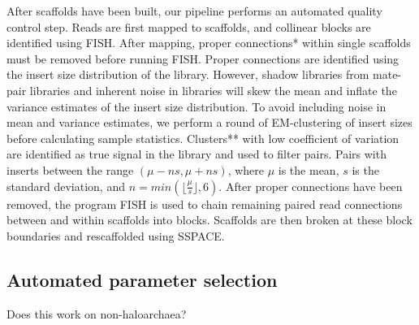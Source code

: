 \documentclass{bioinfo}
\begin{document}
After scaffolds have been built, our pipeline performs an automated quality control step.
Reads are first mapped to scaffolds, and collinear blocks are identified using FISH. After mapping,
proper connections* within single scaffolds must be removed before running FISH. Proper connections
are identified using the insert size distribution of the library. However, shadow libraries from 
mate-pair libraries and inherent noise in libraries will skew the mean and inflate the variance 
estimates of the insert size distribution. To avoid including noise in mean and variance estimates, 
we perform a round of EM-clustering of insert sizes before calculating sample statistics. Clusters**
with low coefficient of variation are identified as true signal in the library and used to filter 
pairs. Pairs with inserts between the range $(\mu-ns,\mu+ns)$, where $\mu$ is the mean, $s$ is the standard
deviation, and $n = min(\lfloor\frac{\mu}{s}\rfloor , 6)$. 
After proper connections have been removed, the program FISH is used to chain remaining paired read 
connections between and within scaffolds into blocks. Scaffolds are then broken at these block boundaries
and rescaffolded using SSPACE.

\subsection{Automated parameter selection}

Does this work on non-haloarchaea?
\end{document}
